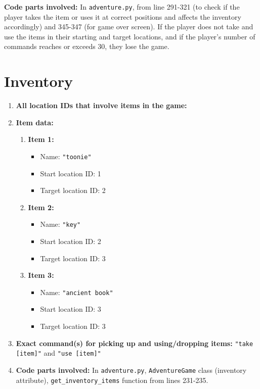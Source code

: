 \documentclass[11pt]{article}
\begin{document}
\textbf{Code parts involved:}  
In \texttt{adventure.py}, from line 291-321 (to check if the player takes the item or uses it  
at correct positions and affects the inventory accordingly) and 345-347 (for game over screen).  
If the player does not take and use the items in their starting and target locations,  
and if the player's number of commands reaches or exceeds 30, they lose the game.

\section*{Inventory}

\begin{enumerate}
    \item \textbf{All location IDs that involve items in the game:}

    \item \textbf{Item data:}
    \begin{enumerate}
        \item \textbf{Item 1:}
        \begin{itemize}
        \item Name: \texttt{"toonie"}
        \item Start location ID: 1
        \item Target location ID: 2
        \end{itemize}
        \item \textbf{Item 2:}
        \begin{itemize}
        \item Name: \texttt{"key"}
        \item Start location ID: 2
        \item Target location ID: 3
        \end{itemize}
        \item \textbf{Item 3:}
        \begin{itemize}
        \item Name: \texttt{"ancient book"}
        \item Start location ID: 3
        \item Target location ID: 3
        \end{itemize}
    \end{enumerate}

    \item \textbf{Exact command(s) for picking up and using/dropping items:}  
    \texttt{"take [item]"} and \texttt{"use [item]"}

    \item \textbf{Code parts involved:}  
    In \texttt{adventure.py}, \texttt{AdventureGame} class (inventory attribute),  
    \texttt{get\_inventory\_items} function from lines 231-235.
\end{enumerate}
\end{document}
